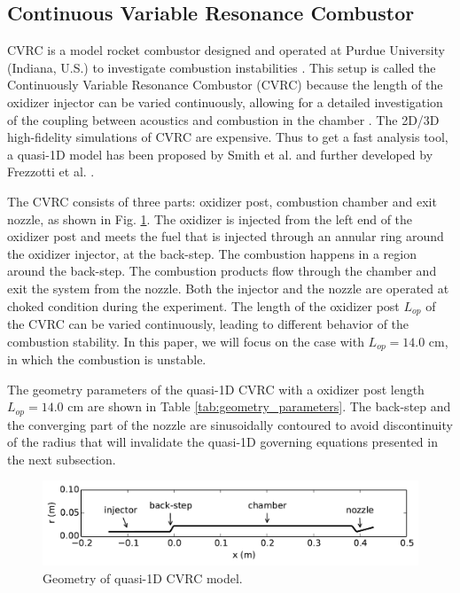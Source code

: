 \subsection{Continuous Variable Resonance Combustor}

CVRC is a model rocket combustor designed and operated at Purdue University (Indiana, U.S.) to investigate combustion instabilities \cite{yu2008combustion}. This setup is called the Continuously Variable Resonance Combustor (CVRC) because the length of the oxidizer injector can be varied continuously, allowing for a detailed investigation of the coupling between acoustics and combustion in the chamber \cite{garby2013simulations}. The 2D/3D high-fidelity simulations of CVRC are expensive. Thus to get a fast analysis tool, a quasi-1D model has been proposed by Smith et al. \cite{smith2008computational} and further developed by Frezzotti et al. \cite{frezzotti2015determination,frezzotti2017numerical,frezzotti2018quasi}. 


The CVRC consists of three parts: oxidizer post, combustion chamber and exit nozzle, as shown in Fig. \ref{fig:radius}. The oxidizer is injected from the left end of the oxidizer post and meets the fuel that is injected through an annular ring around the oxidizer injector, at the back-step. The combustion happens in a region around the back-step. The combustion products flow through the chamber and exit the system from the nozzle.  Both the injector and the nozzle are operated at choked condition during the experiment. The length of the oxidizer post $L_{op}$ of the CVRC can be varied continuously, leading to different behavior of the combustion stability. In this paper, we will focus on the case with $L_{op}= 14.0$ cm, in which the combustion is unstable.

The geometry parameters of the quasi-1D CVRC with a oxidizer post length  $L_{op}= 14.0$ cm are shown in Table \ref{tab:geometry_parameters}.  The back-step and the converging part of the nozzle are sinusoidally contoured to avoid discontinuity of the radius that will invalidate the quasi-1D governing equations presented in the next subsection. 

\begin{figure}
	\centering
	\includegraphics[width=0.8\linewidth]{pic/radius}
	\caption{Geometry of quasi-1D CVRC model.}
	\label{fig:radius}
\end{figure}

